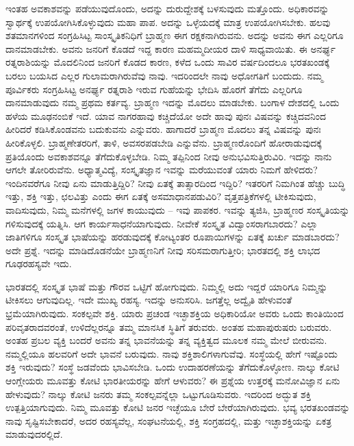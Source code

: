 ಇಂತಹ ಅವಕಾಶವನ್ನು ಪಡೆಯುವುದೊಂದು, ಅದನ್ನು ದುರುದ್ದೇಶಕ್ಕೆ ಬಳಸುವುದು ಮತ್ತೊಂದು. ಅಧಿಕಾರವನ್ನು ಸ್ವಾರ್ಥಕ್ಕೆ ಉಪಯೋಗಿಸಿಕೊಳ್ಳುವುದು ಮಹಾ ಪಾಪ. ಅದನ್ನು ಒಳ್ಳೆಯದಕ್ಕೆ ಮಾತ್ರ ಉಪಯೋಗಿಸಬೇಕು. ಹಲವು ಶತಮಾನಗಳಿಂದ ಸಂಗ್ರಹಿಸಿಟ್ಟ ಸಾಂಸ್ಕೃತಿಕನಿಧಿಗೆ ಬ್ರಾಹ್ಮಣ ಈಗ ರಕ್ಷಕನಾಗಿರುವನು. ಅದನ್ನು ಅವನು ಈಗ ಎಲ್ಲರಿಗೂ ದಾನಮಾಡಬೇಕು. ಅವನು ಜನರಿಗೆ ಕೊಡದೆ ಇದ್ದ ಕಾರಣ ಮಹಮ್ಮದೀಯರ ದಾಳಿ ಸಾಧ್ಯವಾಯಿತು. ಈ ಅನರ್ಘ್ಯ ರತ್ನರಾಶಿಯನ್ನು ಮೊದಲಿನಿಂದ ಜನರಿಗೆ ಕೊಡದ ಕಾರಣ, ಕಳೆದ ಒಂದು ಸಾವಿರ ವರ್ಷದಿಂದಲೂ ಭರತಖಂಡಕ್ಕೆ ಬರಲು ಬಯಸಿದ ಎಲ್ಲರ ಗುಲಾಮರಾಗಿರುವೆವು ನಾವು. ಇದರಿಂದಲೇ ನಾವು ಅಧೋಗತಿಗೆ ಬಂದುದು. ನಮ್ಮ ಪೂರ್ವಿಕರು ಸಂಗ್ರಹಿಸಿಟ್ಟ ಅನರ್ಘ್ಯ ರತ್ನರಾಶಿ ಇರುವ ಗುಹೆಯನ್ನು ಭೇದಿಸಿ ಹೊರಗೆ ತೆಗೆದು ಎಲ್ಲರಿಗೂ ದಾನಮಾಡುವುದು ನಮ್ಮ ಪ್ರಥಮ ಕರ್ತವ್ಯ. ಬ್ರಾಹ್ಮಣ ಇದನ್ನು ಮೊದಲು ಮಾಡಬೇಕು. ಬಂಗಾಳ ದೇಶದಲ್ಲಿ ಒಂದು ಹಳೆಯ ಮೂಢನಂಬಿಕೆ ಇದೆ. ಯಾವ ನಾಗರಹಾವು ಕಚ್ಚಿದೆಯೋ ಅದೇ ಹಾವು ಪುನಃ ವಿಷವನ್ನು ಕಚ್ಚಿದವನಿಂದ ಹೀರಿದರೆ ಕಡಿಸಿಕೊಂಡವನು ಬದುಕುವನು ಎನ್ನುವರು. ಹಾಗಾದರೆ ಬ್ರಾಹ್ಮಣ ಮೊದಲು ತನ್ನ ವಿಷವನ್ನು ಪುನಃ ಹೀರಿಕೊಳ್ಳಲಿ. ಬ್ರಾಹ್ಮಣೇತರರಿಗೆ, ತಾಳಿ, ಅವಸರಪಡಬೇಡಿ ಎನ್ನುವೆನು. ಬ್ರಾಹ್ಮಣರೊಂದಿಗೆ ಹೋರಾಡುವುದಕ್ಕೆ ಪ್ರತಿಯೊಂದು ಅವಕಾಶವನ್ನೂ ತೆಗೆದುಕೊಳ್ಳಬೇಡಿ. ನಿಮ್ಮ ತಪ್ಪಿನಿಂದ ನೀವು ಅನುಭವಿಸುತ್ತಿರುವಿರಿ. ಇದನ್ನು ನಾನು ಆಗಲೇ ತೋರಿರುವೆನು. ಅಧ್ಯಾತ್ಮವಿದ್ಯೆ, ಸಂಸ್ಕೃತಜ್ಞಾನ ಇವನ್ನು ಮರೆಯುವಂತೆ ಯಾರು ನಿಮಗೆ ಹೇಳಿದರು? ಇಂದಿನವರೆಗೂ ನೀವು ಏನು ಮಾಡುತ್ತಿದ್ದಿರಿ? ನೀವು ಏತಕ್ಕೆ ತಾತ್ಸಾರದಿಂದ ಇದ್ದಿರಿ? ಇತರರಿಗೆ ನಿಮಗಿಂತ ಹೆಚ್ಚು ಬುದ್ಧಿ ಇತ್ತು, ಶಕ್ತಿ ಇತ್ತು, ಛಲವಿತ್ತು ಎಂದು ಈಗ ಏತಕ್ಕೆ ಅಸಮಾಧಾನಪಡುವಿರಿ? ವೃತ್ತಪತ್ರಿಕೆಗಳಲ್ಲಿ ಟೀಕಿಸುವುದು, ವಾದಿಸುವುದು, ನಿಮ್ಮ ಮನೆಗಳಲ್ಲಿ ಜಗಳ ಕಾಯುವುದು – ಇವು ಪಾಪಕರ. ಇವನ್ನು ತ್ಯಜಿಸಿ, ಬ್ರಾಹ್ಮಣರ ಸಂಸ್ಕೃತಿಯನ್ನು ಗಳಿಸುವುದಕ್ಕೆ ಯತ್ನಿಸಿ. ಆಗ ಕಾರ್ಯಸಾಧನೆಯಾಗುವುದು. ನೀವೇಕೆ ಸಂಸ್ಕೃತ ವಿದ್ವಾಂಸರಾಗಬಾರದು? ಎಲ್ಲಾ ಜಾತಿಗಳಿಗೂ ಸಂಸ್ಕೃತ ಭಾಷೆಯನ್ನು ಹರಡುವುದಕ್ಕೆ ಕೋಟ್ಯಂತರ ರೂಪಾಯಿಗಳನ್ನು ಏತಕ್ಕೆ ಖರ್ಚು ಮಾಡಬಾರದು? ಅದೇ ಪ್ರಶ್ನೆ. ಇದನ್ನು ಮಾಡಿದೊಡನೆಯೇ ಬ್ರಾಹ್ಮಣನಿಗೆ ನೀವು ಸರಿಸಮರಾಗುತ್ತೀರಿ; ಭಾರತದಲ್ಲಿ ಶಕ್ತಿ ಲಾಭದ ಗೂಢರಹಸ್ಯವೇ ಇದು.

\vskip 4pt

ಭಾರತದಲ್ಲಿ ಸಂಸ್ಕೃತ ಭಾಷೆ ಮತ್ತು ಗೌರವ ಒಟ್ಟಿಗೆ ಹೋಗುವುದು. ನಿಮ್ಮಲ್ಲಿ ಅದು ಇದ್ದರೆ ಯಾರಿಗೂ ನಿಮ್ಮನ್ನು ಟೀಕಿಸಲು ಆಗುವುದಿಲ್ಲ. ಇದೇ ಮುಖ್ಯ ರಹಸ್ಯ. ಇದನ್ನು ಅನುಸರಿಸಿ. ಜಗತ್ತೆಲ್ಲ ಅದ್ವೈತಿ ಹೇಳುವಂತೆ ಭ್ರಮೆಯಾಗಿರುವುದು. ಸಂಕಲ್ಪವೇ ಶಕ್ತಿ. ಯಾರು ಪ್ರಚಂಡ ಇಚ್ಛಾಶಕ್ತಿಯ ಅಧಿಕಾರಿಯೋ ಅವರು ಒಂದು ಕಾಂತಿಯಿಂದ ಪರಿವೃತರಾದವರಂತೆ, ಉಳಿದೆಲ್ಲರನ್ನೂ ತಮ್ಮ ಮಾನಸಿಕ ಸ್ಥಿತಿಗೆ ತರುವರು. ಅಂತಹ ಮಹಾಪುರುಷರು ಬರುವರು. ಅಂತಹ ಪ್ರಬಲ ವ್ಯಕ್ತಿ ಬಂದರೆ ಅವನು ತನ್ನ ಭಾವನೆಯನ್ನು ತನ್ನ ವ್ಯಕ್ತಿತ್ವದ ಮೂಲಕ ನಮ್ಮ ಮೇಲೆ ಬೀರುವನು. ನಮ್ಮಲ್ಲಿಯೂ ಹಲವರಿಗೆ ಅದೇ ಭಾವನೆ ಬರುವುದು. ನಾವು ಶಕ್ತಿಶಾಲಿಗಳಾಗುವೆವು. ಸಂಸ್ಥೆಯಲ್ಲಿ ಹೇಗೆ ಇಷ್ಟೊಂದು ಶಕ್ತಿ ಇರುವುದು? ಸಂಸ್ಥೆ ಜಡವೆಂದು ಭಾವಿಸಬೇಡಿ. ಒಂದು ಉದಾಹರಣೆಯನ್ನು ತೆಗೆದುಕೊಳ್ಳೋಣ. ನಾಲ್ಕು ಕೋಟಿ ಆಂಗ್ಲೇಯರು ಮೂವತ್ತು ಕೋಟಿ ಭಾರತೀಯರನ್ನು ಹೇಗೆ ಆಳುವರು? ಈ ಪ್ರಶ್ನೆಯ ಉತ್ತರಕ್ಕೆ ಮನೋವಿಜ್ಞಾನ ಏನು ಹೇಳುವುದು? ನಾಲ್ಕು ಕೋಟಿ ಜನರು ತಮ್ಮ ಸಂಕಲ್ಪವನ್ನೆಲ್ಲಾ ಒಟ್ಟುಗೂಡಿಸುವರು. ಇದರಿಂದ ಅದ್ಭುತ ಶಕ್ತಿ ಉತ್ಪತ್ತಿಯಾಗುವುದು. ನಿಮ್ಮ ಮೂವತ್ತು ಕೋಟಿ ಜನರ ಇಚ್ಛೆಯೂ ಬೇರೆ ಬೇರೆಯಾಗಿರುವುದು. ಭವ್ಯ ಭರತಖಂಡವನ್ನು ನಾವು ಸೃಷ್ಟಿಸಬೇಕಾದರೆ, ಅದರ ರಹಸ್ಯವೆಲ್ಲ, ಸಂಘಟನೆಯಲ್ಲಿ, ಶಕ್ತಿ ಸಂಗ್ರಹದಲ್ಲಿ, ಮತ್ತು ಇಚ್ಛಾಶಕ್ತಿಯನ್ನು ಏಕತ್ರ ಮಾಡುವುದರಲ್ಲಿದೆ.

